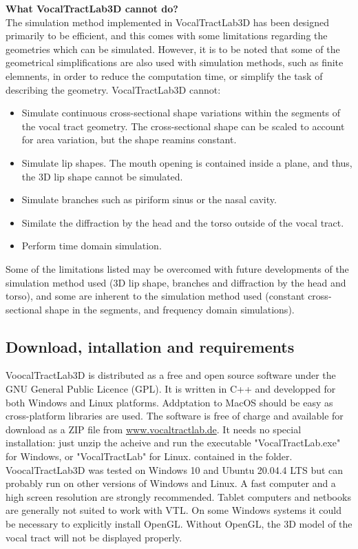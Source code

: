 \documentclass[]{article}
\begin{document}
	\textbf{What VocalTractLab3D cannot do?} \\
	The simulation method implemented in VocalTractLab3D has been 
	designed primarily to be efficient, and this comes with some 
	limitations regarding the geometries which can be simulated.
	However, it is to be noted that some of the geometrical simplifications are also used with simulation methods, such as finite
	elemnents, in order to reduce the computation time, or simplify the task of describing the geometry.
	VocalTractLab3D cannot:
	\begin{itemize}
		\item Simulate continuous cross-sectional shape variations within the segments of the vocal tract geometry. The cross-sectional shape can be scaled to account for area variation, but the shape reamins constant.
		\item Simulate lip shapes. The mouth opening is contained 
		inside a plane, and thus, the 3D lip shape cannot be simulated.
		\item Simulate branches such as piriform sinus or the nasal 
		cavity.
		\item Similate the diffraction by the head and the torso outside
		of the vocal tract.
		\item Perform time domain simulation.
	\end{itemize}
	Some of the limitations listed may be overcomed with future developments of the simulation method used (3D lip shape, branches 
	and diffraction by the head and torso), and some are inherent to 
	the simulation method used (constant cross-sectional shape in the 
	segments, and frequency domain simulations).
	
	\subsection{Download, intallation and requirements}
	
	VoocalTractLab3D is distributed as a free and open source software under the
	GNU General Public Licence (GPL).
	It is written in C++ and developped for both Windows and Linux platforms.
	Addptation to MacOS should be easy as cross-platform libraries are used.
	The software is free of charge and available for download as a ZIP file from
	\url{www.vocaltractlab.de}.
	It needs no special installation: just unzip the acheive and run the executable
	"VocalTractLab.exe" for Windows, or "VocalTractLab" for Linux. 
	contained in the folder.
	VoocalTractLab3D was tested on Windows 10 and Ubuntu 20.04.4 LTS but can probably 
	run on other versions of Windows and Linux.
	A fast computer and a high screen resolution are strongly recommended. 
	Tablet computers and netbooks are generally not suited to work with VTL. 
	On some Windows systems it could be necessary to explicitly install OpenGL. 
	Without OpenGL, the 3D model of the vocal tract will not
	be displayed properly.
	
\end{document}
